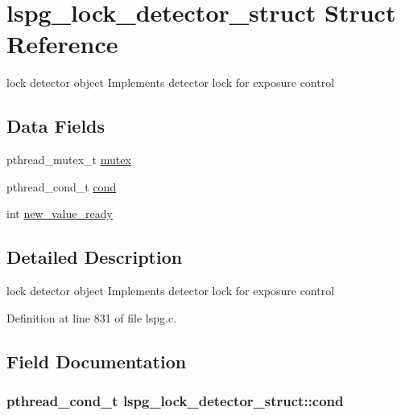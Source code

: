 \hypertarget{structlspg__lock__detector__struct}{\section{lspg\-\_\-lock\-\_\-detector\-\_\-struct Struct Reference}
\label{structlspg__lock__detector__struct}
}


lock detector object Implements detector lock for exposure control  


\subsection*{Data Fields}
\begin{DoxyCompactItemize}
\item 
pthread\-\_\-mutex\-\_\-t \hyperlink{structlspg__lock__detector__struct_ab5ab5534b376a8fbafdd0b54cec4483c}{mutex}
\item 
pthread\-\_\-cond\-\_\-t \hyperlink{structlspg__lock__detector__struct_adc90c859665dccc8717219e824cba0b8}{cond}
\item 
int \hyperlink{structlspg__lock__detector__struct_a62373414b815fe178edd8522b3bd4d78}{new\-\_\-value\-\_\-ready}
\end{DoxyCompactItemize}


\subsection{Detailed Description}
lock detector object Implements detector lock for exposure control 

Definition at line 831 of file lspg.\-c.



\subsection{Field Documentation}
\hypertarget{structlspg__lock__detector__struct_adc90c859665dccc8717219e824cba0b8}{
\subsubsection[{cond}]{\setlength{\rightskip}{0pt plus 5cm}pthread\-\_\-cond\-\_\-t lspg\-\_\-lock\-\_\-detector\-\_\-struct\-::cond}}\label{structlspg__lock__detector__struct_adc90c859665dccc8717219e824cba0b8}


